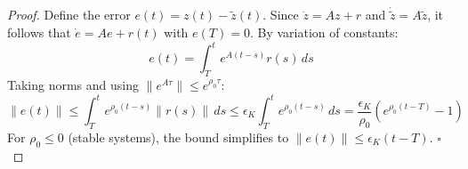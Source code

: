 \documentclass[10pt,a4paper]{amsart}
\begin{document}
\begin{proof}
Define the error $e(t) = z(t) - \tilde{z}(t)$. Since $\dot{z} = Az + r$ and $\dot{\tilde{z}} = A\tilde{z}$, it follows that $\dot{e} = Ae + r(t)$ with $e(T) = 0$. By variation of constants:
\begin{equation}
e(t) = \int_T^t e^{A(t-s)}r(s)\,ds
\end{equation}
Taking norms and using $\|e^{A\tau}\| \leq e^{\rho_0\tau}$:
\begin{equation}
\|e(t)\| \leq \int_T^t e^{\rho_0(t-s)}\|r(s)\|\,ds \leq \epsilon_K \int_T^t e^{\rho_0(t-s)}\,ds = \frac{\epsilon_K}{\rho_0}\left(e^{\rho_0(t-T)} - 1\right)
\end{equation}
For $\rho_0 \leq 0$ (stable systems), the bound simplifies to $\|e(t)\| \leq \epsilon_K(t-T)$. $\square$
\end{proof}
\end{document}
